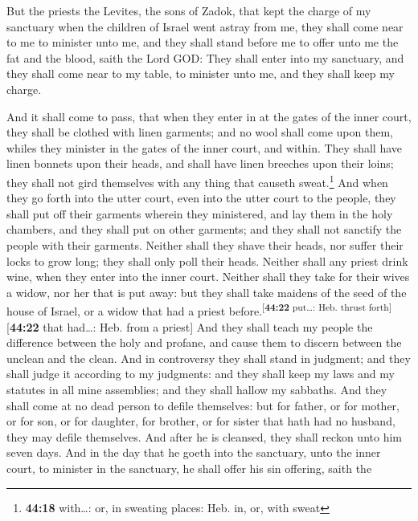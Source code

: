  But the priests the Levites, the sons of Zadok, that
kept the charge of my sanctuary when the children of Israel went astray
from me, they shall come near to me to minister unto me, and they shall
stand before me to offer unto me the fat and the blood, saith the Lord
GOD:  They shall enter into my sanctuary, and they shall
come near to my table, to minister unto me, and they shall keep my
charge.

 And it shall come to pass, that when they enter in at
the gates of the inner court, they shall be clothed with linen garments;
and no wool shall come upon them, whiles they minister in the gates of
the inner court, and within.  They shall have linen
bonnets upon their heads, and shall have linen breeches upon their
loins; they shall not gird themselves with any thing that causeth
sweat.\footnote{\textbf{44:18} with\ldots: or, in sweating places: Heb.
  in, or, with sweat}  And when they go forth into the
utter court, even into the utter court to the people, they shall put off
their garments wherein they ministered, and lay them in the holy
chambers, and they shall put on other garments; and they shall not
sanctify the people with their garments.  Neither shall
they shave their heads, nor suffer their locks to grow long; they shall
only poll their heads.  Neither shall any priest drink
wine, when they enter into the inner court.  Neither
shall they take for their wives a widow, nor her that is put away: but
they shall take maidens of the seed of the house of Israel, or a widow
that had a priest before.\textsuperscript{{[}\textbf{44:22} put\ldots:
Heb. thrust forth{]}}{[}\textbf{44:22} that had\ldots: Heb. from a
priest{]}  And they shall teach my people the difference
between the holy and profane, and cause them to discern between the
unclean and the clean.  And in controversy they shall
stand in judgment; and they shall judge it according to my judgments:
and they shall keep my laws and my statutes in all mine assemblies; and
they shall hallow my sabbaths.  And they shall come at no
dead person to defile themselves: but for father, or for mother, or for
son, or for daughter, for brother, or for sister that hath had no
husband, they may defile themselves.  And after he is
cleansed, they shall reckon unto him seven days.  And in
the day that he goeth into the sanctuary, unto the inner court, to
minister in the sanctuary, he shall offer his sin offering, saith the

